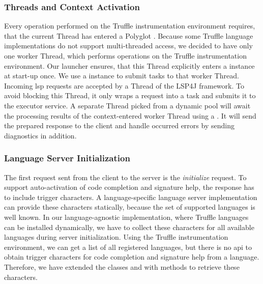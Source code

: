 \subsubsection{Threads and Context Activation}
    Every operation performed on the Truffle instrumentation environment requires, that the current Thread has entered a Polyglot . Because some Truffle language implementations do not support multi-threaded access, we decided to have only one worker Thread, which performs operations on the Truffle instrumentation environment. Our launcher ensures, that this Thread explicitly enters a  instance at start-up once. We use a  instance to submit tasks to that worker Thread. Incoming \ac{lsp} requests are accepted by a Thread of the LSP4J framework. To avoid blocking this Thread, it only wraps a request into a task and submits it to the executor service. A separate Thread picked from a dynamic pool will await the processing results of the context-entered worker Thread using a . It will send the prepared response to the client and handle occurred errors by sending diagnostics in addition.

\subsubsection{Language Server Initialization}
\label{sec:impl:initialization}
    The first request sent from the client to the server is the \emph{initialize} request. To support auto-activation of code completion and signature help, the response has to include trigger characters. A language-specific language server implementation can provide these characters statically, because the set of supported languages is well known. In our language-agnostic implementation, where Truffle languages can be installed dynamically, we have to collect these characters for all available languages during server initialization. Using the Truffle instrumentation environment, we can get a list of all registered languages, but there is no \ac{api} to obtain trigger characters for code completion and signature help from a language. Therefore, we have extended the classes  and  with methods to retrieve these characters.



